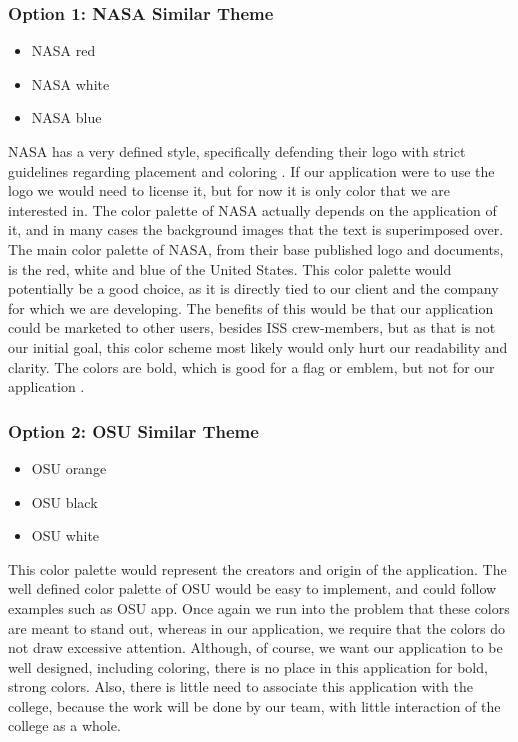 \documentclass[onecolumn, draftclsnofoot,10pt, compsoc]{IEEEtran}
\begin{document}
\subsubsection{Option 1: NASA Similar Theme}
\begin{itemize}
  \item[\fcolorbox{black}{NASAred}{\rule{0pt}{6pt}\rule{6pt}{0pt}}\quad] NASA red
  \item[\fcolorbox{black}{white}{\rule{0pt}{6pt}\rule{6pt}{0pt}}\quad] NASA white
  \item[\fcolorbox{black}{NASAblue}{\rule{0pt}{6pt}\rule{6pt}{0pt}}\quad] NASA blue
\end{itemize}
NASA has a very defined style, specifically defending their logo with strict guidelines regarding placement and coloring \cite{nasa2}.
If our application were to use the logo we would need to license it, but for now it is only color that we are interested in.
The color palette of NASA actually depends on the application of it, and in many cases the background images that the text is superimposed over.
The main color palette of NASA, from their base published logo and documents, is the red, white and blue of the United States.
This color palette would potentially be a good choice, as it is directly tied to our client and the company for which we are developing.
The benefits of this would be that our application could be marketed to other users, besides ISS crew-members, but as that is not our initial goal, this color scheme most likely would only hurt our readability and clarity.
The colors are bold, which is good for a flag or emblem, but not for our application \cite{nasa1}.

\subsubsection{Option 2: OSU Similar Theme}
\begin{itemize}
  \item[\fcolorbox{black}{OSUorange}{\rule{0pt}{6pt}\rule{6pt}{0pt}}\quad] OSU orange
  \item[\fcolorbox{black}{black}{\rule{0pt}{6pt}\rule{6pt}{0pt}}\quad] OSU black
  \item[\fcolorbox{black}{white}{\rule{0pt}{6pt}\rule{6pt}{0pt}}\quad] OSU white
\end{itemize}
This color palette would represent the creators and origin of the application.
The well defined color palette of OSU would be easy to implement, and could follow examples such as OSU app.
Once again we run into the problem that these colors are meant to stand out, whereas in our application, we require that the colors do not draw excessive attention.
Although, of course, we want our application to be well designed, including coloring, there is no place in this application for bold, strong colors.
Also, there is little need to associate this application with the college, because the work will be done by our team, with little interaction of the college as a whole.
\end{document}
